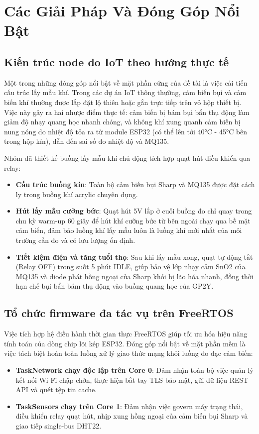 \chapter{Các Giải Pháp Và Đóng Góp Nổi Bật}

\section{Kiến trúc node đo IoT theo hướng thực tế}
Một trong những đóng góp nổi bật về mặt phần cứng của đề tài là việc cải tiến cấu trúc lấy mẫu khí. Trong các dự án IoT thông thường, cảm biến bụi và cảm biến khí thường được lắp đặt lộ thiên hoặc gắn trực tiếp trên vỏ hộp thiết bị. Việc này gây ra hai nhược điểm thực tế: cảm biến bị bám bụi bẩn thụ động làm giảm độ nhạy quang học nhanh chóng, và không khí xung quanh cảm biến bị nung nóng do nhiệt độ tỏa ra từ module ESP32 (có thể lên tới 40°C - 45°C bên trong hộp kín), dẫn đến sai số đo nhiệt độ và MQ135.

Nhóm đã thiết kế buồng lấy mẫu khí chủ động tích hợp quạt hút điều khiển qua relay:
\begin{itemize}
    \item \textbf{Cấu trúc buồng kín}: Toàn bộ cảm biến bụi Sharp và MQ135 được đặt cách ly trong buồng khí acrylic chuyên dụng.
    \item \textbf{Hút lấy mẫu cưỡng bức}: Quạt hút 5V lắp ở cuối buồng đo chỉ quay trong chu kỳ warm-up 60 giây để hút khí cưỡng bức từ bên ngoài chạy qua bề mặt cảm biến, đảm bảo luồng khí lấy mẫu luôn là luồng khí mới nhất của môi trường cần đo và có lưu lượng ổn định.
    \item \textbf{Tiết kiệm điện và tăng tuổi thọ}: Sau khi lấy mẫu xong, quạt tự động tắt (Relay OFF) trong suốt 5 phút IDLE, giúp bảo vệ lớp nhạy cảm SnO2 của MQ135 và diode phát hồng ngoại của Sharp khỏi bị lão hóa nhanh, đồng thời hạn chế bụi bẩn bám thụ động vào buồng quang học của GP2Y.
\end{itemize}

\section{Tổ chức firmware đa tác vụ trên FreeRTOS}
Việc tích hợp hệ điều hành thời gian thực FreeRTOS giúp tối ưu hóa hiệu năng tính toán của dòng chip lõi kép ESP32. Đóng góp nổi bật về mặt phần mềm là việc tách biệt hoàn toàn luồng xử lý giao thức mạng khỏi luồng đo đạc cảm biến:
\begin{itemize}
    \item \textbf{TaskNetwork chạy độc lập trên Core 0}: Đảm nhận toàn bộ việc quản lý kết nối Wi-Fi chập chờn, thực hiện bắt tay TLS bảo mật, gửi dữ liệu REST API và quét tệp tin cache.
    \item \textbf{TaskSensors chạy trên Core 1}: Đảm nhận việc govern máy trạng thái, điều khiển relay quạt hút, nhịp xung hồng ngoại của cảm biến bụi Sharp và giao tiếp single-bus DHT22.
\end{itemize}

